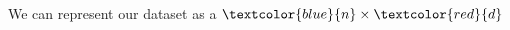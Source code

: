 \documentclass[preview]{standalone}
\begin{document}
\begin{center}
We can represent our dataset as a $\textcolor{blue}{n} \times \textcolor{red}{d}$
\end{center}
\end{document}
